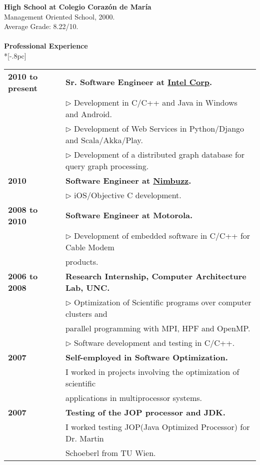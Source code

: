 \documentclass[letter,11pt,english]{article}
\begin{document}
{\bf High School at Colegio Coraz\'on de Mar\'ia}\\
Management Oriented School, 2000.\\
Average Grade: 8.22/10.\\
\\
{\large \bf Professional Experience}\\*[-.8pc]
\underline{\hspace{6in}}
\\
\begin{tabular}{ p{3cm} l }
  {\bf 2010 to present} & {\bf Sr. Software Engineer at \href{http://www.intel.com}{Intel Corp}.}\\
                        & 	$\triangleright$ Development in C/C++ and Java in Windows and Android.\\ 
                        & 	$\triangleright$ Development of Web Services in Python/Django and Scala/Akka/Play.\\
                        & 	$\triangleright$ Development of a distributed graph database for query graph processing.\\
  {\bf 2010 }           & 	{\bf Software Engineer at \href{http://www.nimbuzz.com/en/about}{Nimbuzz}.}\\
                        & 	$\triangleright$ iOS/Objective C development.\\
  {\bf 2008 to 2010}    & 	{\bf Software Engineer at Motorola.}\\
                        & 	$\triangleright$ Development of embedded software in C/C++ for Cable Modem\\ 
                        &   products.\\
  {\bf 2006 to 2008}    & 	{\bf Research Internship, Computer Architecture Lab, UNC.}\\
                        & 	$\triangleright$ Optimization of Scientific programs over computer clusters and\\
                        & 	parallel programming with MPI, HPF and OpenMP.\\
                        & 	$\triangleright$ Software development and testing in C/C++.\\
  {\bf 2007}            & 	{\bf Self-employed in Software Optimization.}\\
                        &	I worked in projects involving the optimization of scientific\\
                        &	applications in multiprocessor systems.\\            
  {\bf 2007}            & 	{\bf Testing of the JOP processor and JDK.}\\
                        & 	I worked testing JOP(Java Optimized Processor) for Dr. Martin\\
                        &   Schoeberl from TU Wien.
			
\end{tabular} 
\\
\end{document}
